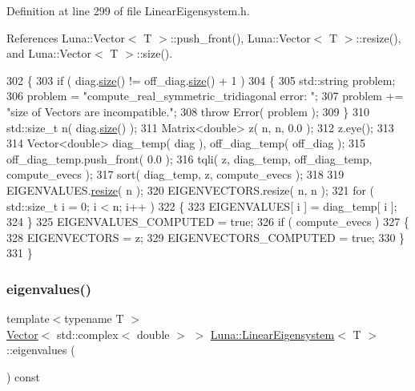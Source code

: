 Definition at line 299 of file Linear\+Eigensystem.\+h.



References Luna\+::\+Vector$<$ T $>$\+::push\+\_\+front(), Luna\+::\+Vector$<$ T $>$\+::resize(), and Luna\+::\+Vector$<$ T $>$\+::size().


\begin{DoxyCode}
302   \{
303     \textcolor{keywordflow}{if} ( diag.\hyperlink{classLuna_1_1Vector_ac9b6ed7a0df401728f27c193fbc8f4d8}{size}() != off\_diag.\hyperlink{classLuna_1_1Vector_ac9b6ed7a0df401728f27c193fbc8f4d8}{size}() + 1 )
304     \{
305       std::string problem;
306       problem = \textcolor{stringliteral}{"compute\_real\_symmetric\_tridiagonal error: "};
307       problem += \textcolor{stringliteral}{"size of Vectors are incompatible."};
308       \textcolor{keywordflow}{throw} Error( problem );
309     \}
310     std::size\_t n( diag.\hyperlink{classLuna_1_1Vector_ac9b6ed7a0df401728f27c193fbc8f4d8}{size}() );
311     Matrix<double> z( n, n, 0.0 );
312     z.eye();
313 
314     Vector<double> diag\_temp( diag ), off\_diag\_temp( off\_diag );
315     off\_diag\_temp.push\_front( 0.0 );
316     tqli( z, diag\_temp, off\_diag\_temp, compute\_evecs );
317     sort( diag\_temp, z, compute\_evecs );
318 
319     EIGENVALUES.\hyperlink{classLuna_1_1Vector_ae1394f960d5cac3e60f6b1561f38e453}{resize}( n );
320     EIGENVECTORS.resize( n, n );
321     \textcolor{keywordflow}{for} ( std::size\_t i = 0; i < n; i++ )
322     \{
323       EIGENVALUES[ i ] = diag\_temp[ i ];
324     \}
325     EIGENVALUES\_COMPUTED = \textcolor{keyword}{true};
326     \textcolor{keywordflow}{if} ( compute\_evecs )
327     \{
328       EIGENVECTORS = z;
329       EIGENVECTORS\_COMPUTED = \textcolor{keyword}{true};
330     \}
331   \}
\end{DoxyCode}
\mbox{\label{classLuna_1_1LinearEigensystem_ad74f60a4830eefb2858ab92765dc0ae4}} 
\subsubsection{\texorpdfstring{eigenvalues()}{eigenvalues()}}
{\footnotesize\ttfamily template$<$typename T $>$ \\
\hyperlink{classLuna_1_1Vector}{Vector}$<$ std\+::complex$<$ double $>$ $>$ \hyperlink{classLuna_1_1LinearEigensystem}{Luna\+::\+Linear\+Eigensystem}$<$ T $>$\+::eigenvalues (\begin{DoxyParamCaption}{ }\end{DoxyParamCaption}) const\hspace{0.3cm}{\ttfamily [inline]}}



